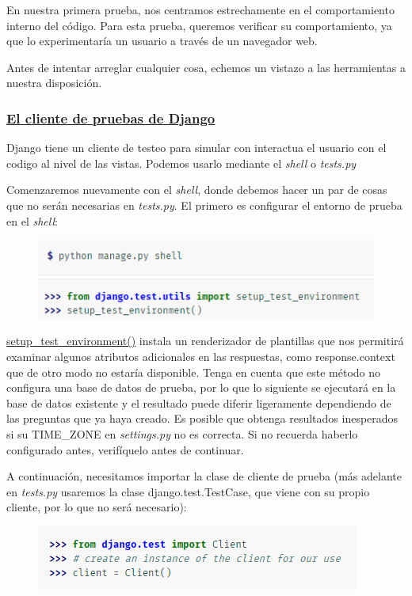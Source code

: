 \documentclass[10pt]{article}
\newcommand{\django}[1]{{\textcolor{G}{Django} #1}}
\begin{document}
En nuestra primera prueba, nos centramos estrechamente en el comportamiento interno del código. Para esta prueba, queremos verificar su comportamiento, ya que lo experimentaría un usuario a través de un navegador web.

Antes de intentar arreglar cualquier cosa, echemos un vistazo a las herramientas a nuestra disposición.

\subsubsection*{\underline{El cliente de pruebas de \django{}}}
\django{} tiene un cliente de testeo para simular con interactua el usuario con el codigo al nivel de las vistas. Podemos usarlo mediante el \textit{shell} o \textit{tests.py}

Comenzaremos nuevamente con el \textit{shell}, donde debemos hacer un par de cosas que no serán necesarias en \textit{tests.py}. El primero es configurar el entorno de prueba en el \textit{shell}:
\begin{figure}[H]
\begin{center}
\includegraphics[scale=1]{figuras/3/35/357/img1.png}
\end{center}
\end{figure}

{\href{https://docs.djangoproject.com/en/3.0/topics/testing/advanced/\#django.test.utils.setup_test_environment}{\textcolor{B}{setup\_test\_environment()}}}
 instala un renderizador de plantillas que nos permitirá examinar algunos atributos adicionales en las respuestas, como \textcolor{G}{response.context} que de otro modo no estaría disponible. Tenga en cuenta que este método no configura una base de datos de prueba, por lo que lo siguiente se ejecutará en la base de datos existente y el resultado puede diferir ligeramente dependiendo de las preguntas que ya haya creado. Es posible que obtenga resultados inesperados si su  \textcolor{G}{TIME\_ZONE} en \textit{settings.py} no es correcta. Si no recuerda haberlo configurado antes, verifíquelo antes de continuar.

A continuación, necesitamos importar la clase de cliente de prueba (más adelante en \textit{tests.py} usaremos la clase \textcolor{G}{django.test.TestCase}, que viene con su propio cliente, por lo que no será necesario):
\begin{figure}[H]
\begin{center}
\includegraphics[scale=1]{figuras/3/35/357/img2.png}
\end{center}
\end{figure}
\end{document}
